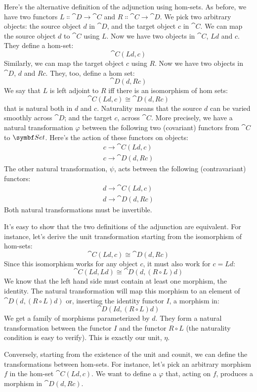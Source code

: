 \noindent
Here's the alternative definition of the adjunction using hom-sets. As
before, we have two functors $L \Colon \cat{D} \to \cat{C}$ and
$R \Colon \cat{C} \to \cat{D}$. We pick two arbitrary objects: the
source object $d$ in $\cat{D}$, and the target object $c$
in $\cat{C}$. We can map the source object $d$ to $\cat{C}$ using
$L$. Now we have two objects in $\cat{C}$, $L d$ and
$c$. They define a hom-set:
\[\cat{C}(L d, c)\]
Similarly, we can map the target object $c$ using $R$. Now
we have two objects in $\cat{D}$, $d$ and $R c$. They,
too, define a hom set:
\[\cat{D}(d, R c)\]
We say that $L$ is left adjoint to $R$ iff there is an
isomorphism of hom sets:
\[\cat{C}(L d, c) \cong \cat{D}(d, R c)\]
that is natural both in $d$ and $c$.
Naturality means that the source $d$ can be varied smoothly
across $\cat{D}$; and the target $c$, across $\cat{C}$. More
precisely, we have a natural transformation $\varphi$ between the
following two (covariant) functors from $\cat{C}$ to $\Set$. Here's
the action of these functors on objects:
\begin{gather*}
  c \to \cat{C}(L d, c) \\
  c \to \cat{D}(d, R c)
\end{gather*}
The other natural transformation, $\psi$, acts between the following
(contravariant) functors:
\begin{gather*}
  d \to \cat{C}(L d, c) \\
  d \to \cat{D}(d, R c)
\end{gather*}
Both natural transformations must be invertible.

It's easy to show that the two definitions of the adjunction are
equivalent. For instance, let's derive the unit transformation starting
from the isomorphism of hom-sets:
\[\cat{C}(L d, c) \cong \cat{D}(d, R c)\]
Since this isomorphism works for any object $c$, it must also
work for $c = L d$:
\[\cat{C}(L d, L d) \cong \cat{D}(d, (R \circ L) d)\]
We know that the left hand side must contain at least one morphism, the
identity. The natural transformation will map this morphism to an
element of $\cat{D}(d, (R \circ L) d)$ or, inserting the identity
functor $I$, a morphism in:
\[\cat{D}(I d, (R \circ L) d)\]
We get a family of morphisms parameterized by $d$. They form a
natural transformation between the functor $I$ and the functor
$R \circ L$ (the naturality condition is easy to verify). This is
exactly our unit, $\eta$.

Conversely, starting from the existence of the unit and counit, we can
define the transformations between hom-sets. For instance, let's pick an
arbitrary morphism $f$ in the hom-set $\cat{C}(L d, c)$. We
want to define a $\varphi$ that, acting on $f$, produces a
morphism in $\cat{D}(d, R c)$.

